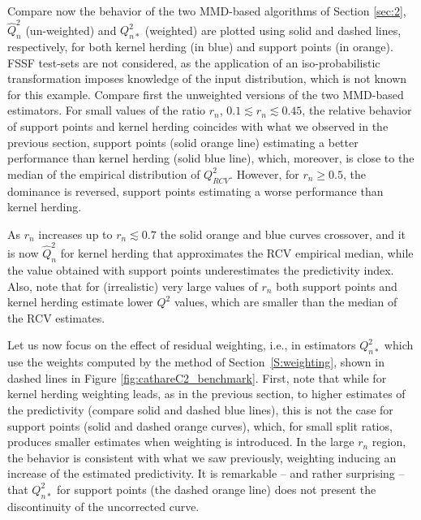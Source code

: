 Compare now the behavior of the two MMD-based algorithms of Section \ref{sec:2}, $\widehat Q^2_n$ (un-weighted) and $Q_{n*}^2$ (weighted) are plotted using solid and dashed lines, respectively, for both kernel herding (in blue) and support points (in orange). FSSF test-sets are not considered, as the application of an iso-probabilistic transformation imposes knowledge of the input distribution, which is not known for this example. 
Compare first the unweighted versions of the two MMD-based estimators. 
For small values of the ratio $r_n$, $0.1 \lesssim r_n \lesssim 0.45$, the relative behavior of support points and kernel herding coincides with what we observed in the previous section, support points (solid orange line) estimating a better performance than kernel herding (solid blue line), which, moreover, is close to the median of the empirical distribution of $Q^2_{RCV}$. However, for $r_n \geq 0.5$, the dominance is reversed, support points estimating a worse performance than kernel herding. 

As $r_n$ increases up to $r_n \lesssim 0.7$ the solid orange and blue curves crossover, and it is now $\widehat Q^2_n$ for kernel herding that approximates the RCV empirical median, while the value obtained with support points underestimates the predictivity index. Also, note that for (irrealistic) very large values of $r_n$ both support points and kernel herding estimate lower $Q^2$ values, which are smaller than the median of the RCV estimates.

Let us now focus on the effect of residual weighting, i.e., in estimators $Q_{n*}^2$ which use the weights computed by the method of Section~\ref{S:weighting}, shown in dashed lines in Figure \ref{fig:cathareC2_benchmark}. First, note that while for kernel herding weighting leads, as in the previous section, to higher estimates of the predictivity (compare solid and dashed blue lines), this is not the case for support points (solid and dashed orange curves), which, for small split ratios, produces smaller estimates when weighting is introduced. In the large $r_n$ region, the behavior is consistent with what we saw previously, weighting inducing an increase of the estimated predictivity. It is remarkable -- and rather surprising -- that $Q_{n*}^2$ for support points (the dashed orange line) does not present the discontinuity of the uncorrected curve. 


